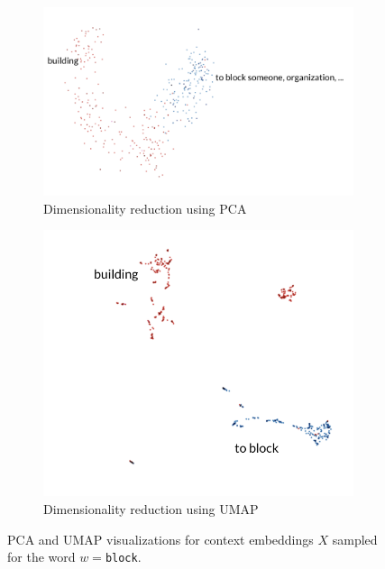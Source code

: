 \documentclass[a4paper,12pt,twoside,openright]{report}
\begin{document}
\begin{figure}[H]
\begin{subfigure}{.45\textwidth}
  \centering
  \includegraphics[width=.8\linewidth]{./assets/analysis/block_pca.png}
  \caption{Dimensionality reduction using PCA}
  \label{fig:sfig1}
\end{subfigure}%
\hfill
\begin{subfigure}{.45\textwidth}
  \centering
  \includegraphics[width=.8\linewidth]{./assets/analysis/block_umap.png}
  \caption{Dimensionality reduction using UMAP}
  \label{fig:sfig2}
\end{subfigure}
\caption{PCA and UMAP visualizations for context embeddings $X$ sampled for the word $w=$\texttt{block}. }
\label{fig:was_tensorboard}
\end{figure}
\end{document}
